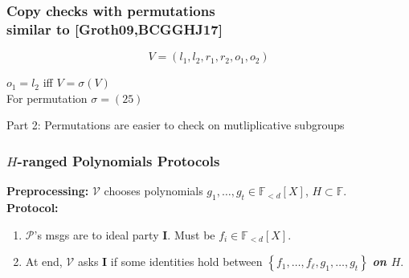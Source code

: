 \documentclass[shadesubsections,trans,14pt,mathserif]{beamer}
\newcommand{\F}{\ensuremath{\mathbb F}}
\newcommand{\set}[1]{\ensuremath{\left\{#1\right\}}}
\newcommand{\ver}{\ensuremath{\mathcal{V}}}
\newcommand{\prv}{\ensuremath{\mathcal{P}}}
\newcommand{\polysofdeg}[1]{\F_{< #1}[X]}
\newcommand{\ideal}{\mathbf{I}}
\begin{document}
\begin{frame}
\frametitle{Copy checks with permutations\\ \normalsize{similar to [Groth09,BCGGHJ17]}}   %
 
 
 \[V= (l_1,l_2,r_1,r_2,o_1,o_2)\]
 
 $o_1=l_2$ iff $V=\sigma(V)$ \\
 For permutation $\sigma = (25)$
 
 

\end{frame}





\begin{frame}
\large{Part 2: Permutations are easier to check on mutliplicative subgroups
}

\end{frame}

% 




\begin{frame}
\frametitle{$H$-ranged Polynomials Protocols}   %
 
 \textbf{Preprocessing:} $\ver$ chooses polynomials $g_1,\ldots,g_t\in \polysofdeg{d}$, $H\subset\F$.\\
 \vspace{0.4in}
\textbf{Protocol:}
 
 \begin{enumerate}

\item $\prv$'s  msgs are to ideal party $\ideal$. Must be $f_i\in \polysofdeg{d}$.
\item At end, $\ver$ asks $\ideal$ if some identities hold between $\set{f_1,\ldots,f_\ell,g_1,\ldots,g_t}$   \textbf{\textit{on $H$}}. 

\end{enumerate}
\end{frame}
\end{document}
